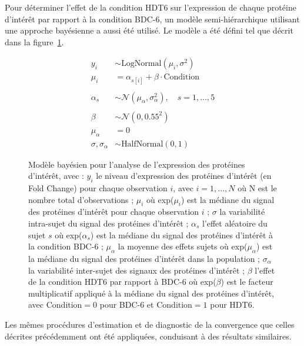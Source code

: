 \documentclass[11pt]{report}
\begin{document}
Pour déterminer l'effet de la condition HDT6 sur l'expression de chaque protéine d'intérêt par rapport à la condition BDC-6, un modèle semi-hiérarchique utilisant une approche bayésienne a aussi été utilisé. Le modèle a été défini tel que décrit dans la figure~\ref{fig:modèle2}.

\begin{figure}[h!]
	\centering
	\[
	\begin{aligned}
		y_i &\sim \text{LogNormal}(\mu_i, \sigma^2) \\
		\mu_i &= \alpha_{s[i]} + \beta \cdot \text{Condition} \\
		\\
		\alpha_s &\sim \mathcal{N}(\mu_{\alpha}, \sigma_{\alpha}^2), \quad s = 1, \dots, 5 \\
		\\
		\beta &\sim \mathcal{N}(0, 0.55^2) \\
		\mu_{\alpha} &= 0 \\
		\sigma, \sigma_{\alpha} &\sim \text{HalfNormal}(0, 1)
	\end{aligned}
	\]
	\caption[Modèle bayésien pour l'analyse de l'expression des protéines d'intérêt.]{Modèle bayésien pour l'analyse de l'expression des protéines d'intérêt, avec :
	\newline $y_i$ le niveau d'expression des protéines d'intérêt (en Fold Change) pour chaque observation $i$, avec $i = 1,...,N$ où N est le nombre total d'observations ; $\mu_i$ où exp($\mu_i$) est la médiane du signal des protéines d'intérêt pour chaque observation $i$ ; $\sigma$ la variabilité intra-sujet du signal des protéines d'intérêt ; $\alpha_s$ l'effet aléatoire du sujet $s$ où exp($\alpha_s$) est la médiane du signal des protéines d'intérêt à la condition BDC-6 ; $\mu_{\alpha}$ la moyenne des effets sujets où exp($\mu_{\alpha}$) est la médiane du signal des protéines d'intérêt dans la population ; $\sigma_{\alpha}$ la variabilité inter-sujet des signaux des protéines d'intérêt ; $\beta$ l'effet de la condition HDT6 par rapport à BDC-6 où exp($\beta$) est le facteur multiplicatif appliqué à la médiane du signal des protéines d'intérêt, avec $\text{Condition} = 0$ pour BDC-6 et $\text{Condition} = 1$ pour HDT6.}
	\label{fig:modèle2}
\end{figure}

Les mêmes procédures d'estimation et de diagnostic de la convergence que celles décrites précédemment ont été appliquées, conduisant à des résultats similaires.
\end{document}
